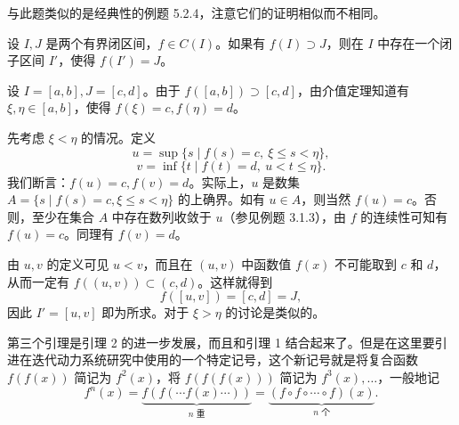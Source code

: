 \begin{xremark}
与此题类似的是经典性的例题 5.2.4，注意它们的证明相似而不相同。
\end{xremark}

\begin{xexample}[5.6.2（引理 2）]
设 $I,J$ 是两个有界闭区间，$f\in C(I)$。如果有 $f(I)\supset J$，则在 $I$ 中存在一个闭子区间 $I'$，使得 $f(I')=J$。
\end{xexample}
\begin{xproof}
设 $I=[a,b],J=[c,d]$。由于 $f([a,b])\supset[c,d]$，由介值定理知道有 $\xi,\eta\in[a,b]$，使得 $f(\xi)=c,f(\eta)=d$。

先考虑 $\xi<\eta$ 的情况。定义
\[
  u=\sup\{s\mid f(s)=c,\ \xi\le s<\eta\},
\]
\[
  v=\inf\{t\mid f(t)=d,\ u<t\le\eta\}.
\]
我们断言：$f(u)=c,f(v)=d$。实际上，$u$ 是数集 $A=\{s\mid f(s)=c,\xi\le s<\eta\}$ 的上确界。如有 $u\in A$，则当然 $f(u)=c$。否则，至少在集合 $A$ 中存在数列收敛于 $u$（参见例题 3.1.3），由 $f$ 的连续性可知有 $f(u)=c$。同理有 $f(v)=d$。

由 $u,v$ 的定义可见 $u<v$，而且在 $(u,v)$ 中函数值 $f(x)$ 不可能取到 $c$ 和 $d$，从而一定有 $f((u,v))\subset(c,d)$。这样就得到
\[
  f([u,v])=[c,d]=J,
\]
因此 $I'=[u,v]$ 即为所求。对于 $\xi>\eta$ 的讨论是类似的。
\end{xproof}

第三个引理是引理 2 的进一步发展，而且和引理 1 结合起来了。但是在这里要引进在迭代动力系统研究中使用的一个特定记号，这个新记号就是将复合函数 $f(f(x))$ 简记为 $f^2(x)$，将 $f(f(f(x)))$ 简记为 $f^3(x),\ldots$，一般地记
\begin{equation}
  f^n(x)=\underbrace{f(f(\cdots f(x)\cdots))}_{n\text{ 重}}=\underbrace{(f\circ f\circ\cdots\circ f)(x)}_{n\text{ 个}}.
  \tag{5.6}
  \label{eq:5.6}
\end{equation}

